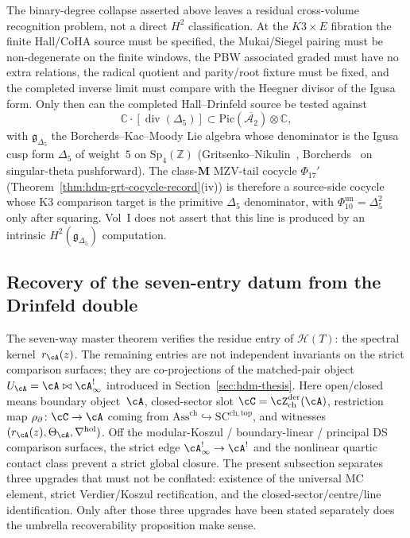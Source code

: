 \begin{remark}
\label{rem:holo-master-igusa}
The binary-degree collapse asserted above leaves a residual
cross-volume recognition problem, not a direct $H^2$ classification.
At the $K3 \times E$ fibration the finite Hall/CoHA source must be
specified, the Mukai/Siegel pairing must be non-degenerate on the
finite windows, the PBW associated graded must have no extra relations,
the radical quotient and parity/root fixture must be fixed, and the
completed inverse limit must compare with the Heegner divisor of the
Igusa form. Only then can the completed Hall--Drinfeld source be tested
against
\[
 \mathbb C\cdot[\operatorname{div}(\Delta_5)]
 \subset \mathrm{Pic}(\overline{\mathcal A_2})\otimes\mathbb C,
\]
with $\mathfrak{g}_{\Delta_5}$ the Borcherds--Kac--Moody Lie algebra
whose denominator is the Igusa cusp form $\Delta_5$ of weight~$5$ on
$\mathrm{Sp}_4(\mathbb{Z})$
(Gritsenko--Nikulin~\cite{GritsenkoNikulin18},
Borcherds~\cite{Borcherds95} on singular-theta pushforward). The
class-$\mathbf{M}$ MZV-tail cocycle $\Phi_{17}'$
(Theorem~\ref{thm:hdm-grt-cocycle-record}(iv)) is therefore a
source-side cocycle whose K3 comparison target is the primitive
$\Delta_5$ denominator, with
$\Phi_{10}^{\mathrm{un}}=\Delta_5^2$ only after squaring. Vol~I does
not assert that this line is produced by an intrinsic
$H^2(\mathfrak g_{\Delta_5})$ computation.
\end{remark}

\subsection{Recovery of the seven-entry datum from the Drinfeld double}
\label{subsec:hdm-u-a-recoverability}

The seven-way master theorem verifies the residue entry of
$\mathcal{H}(T)$: the spectral kernel~$r_\cA(z)$. The remaining
entries are not independent invariants on the strict comparison
surfaces; they are co-projections of the matched-pair object
$U_\cA = \cA \bowtie \cA^{!}_\infty$ introduced in
Section~\ref{sec:hdm-thesis}. Here open/closed means boundary
object~$\cA$, closed-sector slot
$\cC=\cZ^{\mathrm{der}}_{\mathrm{ch}}(\cA)$, restriction map
$\rho_{\partial}\colon \cC\to\cA$ coming from
$\mathrm{Ass}^{\mathrm{ch}}\hookrightarrow\mathrm{SC}^{\mathrm{ch,top}}$,
and witnesses $(r_\cA(z),\Theta_\cA,\nabla^{\mathrm{hol}})$. Off the
modular-Koszul / boundary-linear / principal DS comparison surfaces,
the strict edge $\cA^{!}_\infty\to\cA^!$ and the nonlinear quartic
contact class prevent a strict global closure. The present subsection
separates three upgrades that must not be conflated: existence of the
universal MC element, strict Verdier/Koszul rectification, and the
closed-sector/centre/line identification. Only after those three upgrades have
been stated separately does the umbrella recoverability proposition
make sense.

